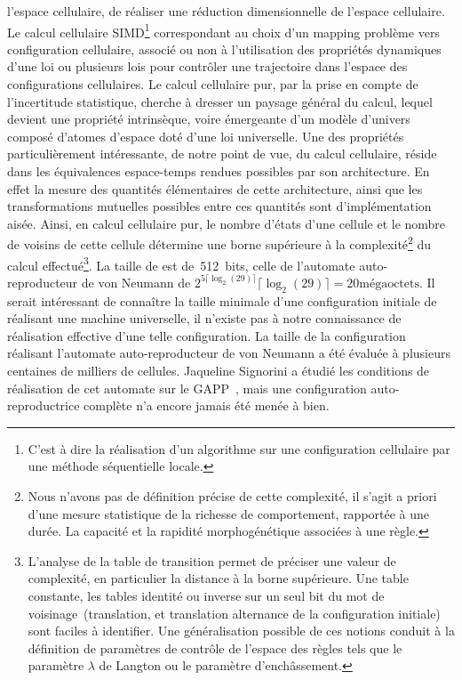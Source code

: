 l'espace cellulaire, de r\'ealiser une r\'eduction
dimensionnelle de l'espace cellulaire. %
Le calcul cellulaire SIMD\footnote{%
  C'est \`a dire la r\'ealisation d'un algorithme sur une configuration
  cellulaire par une m\'ethode s\'equentielle locale.} %
correspondant au choix d'un mapping probl\`eme vers configuration cellulaire,
associ\'e ou non \`a l'utilisation des propri\'et\'es dynamiques d'une loi ou
plusieurs lois pour contr\^oler une trajectoire dans l'espace des
configurations cellulaires. %
Le calcul cellulaire pur, par la prise en compte de l'incertitude
statistique, cherche \`a dresser un paysage g\'en\'eral du calcul,
lequel devient une propri\'et\'e intrins\`eque, voire \'emergeante d'un mod\`ele
d'univers compos\'e d'atomes d'espace dot\'e d'une loi universelle. %
Une des propri\'et\'es particuli\`erement int\'eressante, de notre point de
vue, du calcul cellulaire, r\'eside dans les \'equivalences espace-temps
rendues possibles par son architecture. %
En effet la mesure des quantit\'es \'el\'ementaires de cette architecture,
ainsi que les transformations mutuelles possibles entre ces quantit\'es
sont d'impl\'ementation ais\'ee. %
Ainsi, en calcul cellulaire pur, le nombre d'\'etats d'une cellule et le
nombre de voisins de cette cellule d\'etermine une borne sup\'erieure \`a la
complexit\'e\footnote{%
  Nous n'avons pas de d\'efinition pr\'ecise de cette complexit\'e,
  il s'agit a priori d'une mesure statistique de la richesse de
  comportement, rapport\'ee \`a une dur\'ee. %
  La capacit\'e et la rapidit\'e morphog\'en\'etique associ\'ees \`a une r\`egle.} %
du calcul effectu\'e\footnote{%
  L'analyse de la table de transition permet de pr\'eciser une valeur
  de complexit\'e, en particulier la distance \`a la borne sup\'erieure. %
  Une table constante, les tables identit\'e ou inverse sur un seul
  bit du mot de voisinage~(translation, et translation alternance de
  la configuration initiale) sont faciles \`a identifier. %
  Une g\'en\'eralisation possible de ces notions conduit \`a la d\'efinition
  de param\`etres de contr\^ole de l'espace des r\`egles tels que le
  param\`etre $\lambda$ de Langton ou le param\`etre d'ench\^assement.}. %
La taille de  est de~512~bits,
celle de l'automate auto-reproducteur de von Neumann de
$2^{5\lceil\log_{2}(29)\rceil}\lceil\log_{2}(29)\rceil =
20 \text{m\'egaoctets}$. %
Il serait int\'eressant de conna\^itre la taille minimale d'une
configuration initiale de  r\'ealisant une machine
universelle, il n'existe pas \`a notre connaissance de r\'ealisation
effective d'une telle configuration. %
La taille de la configuration r\'ealisant l'automate auto-reproducteur
de von Neumann a \'et\'e \'evalu\'ee \`a plusieurs centaines de milliers de
cellules. %
Jaqueline Signorini a \'etudi\'e les conditions de r\'ealisation de cet
automate sur le GAPP~\cite[]{Signorini92}, mais une configuration
auto-reproductrice compl\`ete n'a encore jamais \'et\'e men\'ee \`a bien. %

